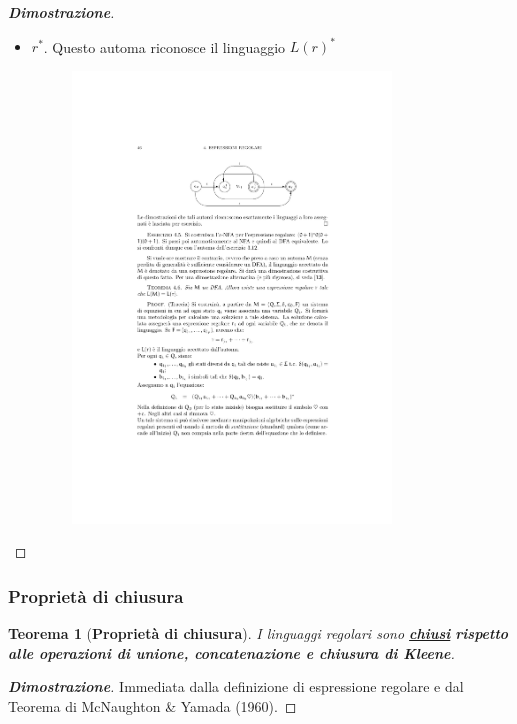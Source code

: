 \documentclass[a4paper]{article}
\newtheorem{theorem}{Teorema}
\begin{document}
\begin{proof}[\textbf{Dimostrazione}]
\begin{itemize}
			\item $r^{*}$. Questo automa riconosce il linguaggio $L\left(r\right)^{*}$
				\begin{figure}[!htp]
					\centering
					\includegraphics[width=0.8\textwidth]{img/teorema_McN-Yamada6.pdf}
				\end{figure}
		\end{itemize}
	\end{proof}

	\newpage

	\subsubsection{Proprietà di chiusura}
	
	\begin{theorem}[\textcolor{Red3}{\textbf{Proprietà di chiusura}}]
		I linguaggi regolari sono \textbf{\underline{chiusi}} \textbf{rispetto alle operazioni di unione, concatenazione e chiusura di Kleene}.
	\end{theorem}
	\begin{proof}[\textcolor{Green4}{\textbf{Dimostrazione}}]
		Immediata dalla definizione di espressione regolare e dal Teorema di McNaughton \& Yamada (1960).
	\end{proof}
\end{document}
